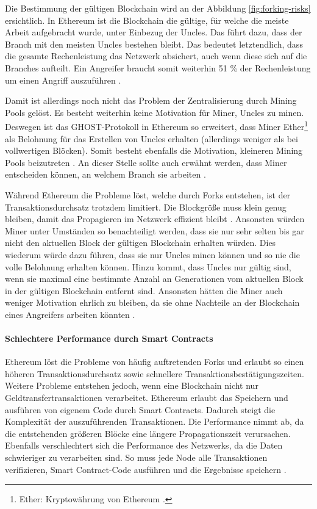 Die Bestimmung der gültigen Blockchain wird an der Abbildung \ref{fig:forking-risks} ersichtlich. In Ethereum ist die Blockchain die gültige, für welche die meiste Arbeit aufgebracht wurde, unter Einbezug der Uncles. Das führt dazu, dass der Branch mit den meisten Uncles bestehen bleibt. Das bedeutet letztendlich, dass die gesamte Rechenleistung das Netzwerk absichert, auch wenn diese sich auf die Branches aufteilt. Ein Angreifer braucht somit weiterhin 51 \% der Rechenleistung um einen Angriff auszuführen \cite{SompolinskyAcceleratingBitcoinTransaction2013}.

Damit ist allerdings noch nicht das Problem der Zentralisierung durch Mining Pools gelöst. Es besteht weiterhin keine Motivation für Miner, Uncles zu minen. Deswegen ist das GHOST-Protokoll in Ethereum so erweitert, dass Miner Ether\footnote{Ether: Kryptowährung von Ethereum \cite{EthereumTeamEthereumWhitePaper2017}.} als Belohnung für das Erstellen von Uncles erhalten (allerdings weniger als bei vollwertigen Blöcken). Somit besteht ebenfalls die Motivation, kleineren Mining Pools beizutreten \cite{EthereumTeamEthereumWhitePaper2017}. An dieser Stelle sollte auch erwähnt werden, dass Miner entscheiden können, an welchem Branch sie arbeiten \cite{ZhengBlockchainChallengesOpportunities2017}.

Während Ethereum die Probleme löst, welche durch Forks entstehen, ist der Transaktionsdurchsatz trotzdem limitiert. Die Blockgröße muss klein genug bleiben, damit das Propagieren im Netzwerk effizient bleibt \cite{SchererPerformanceScalabilityBlockchain2017}. Ansonsten würden Miner unter Umständen so benachteiligt werden, dass sie nur sehr selten bis gar nicht den aktuellen Block der gültigen Blockchain erhalten würden. Dies wiederum würde dazu führen, dass sie nur Uncles minen können und so nie die volle Belohnung erhalten können. Hinzu kommt, dass Uncles nur gültig sind, wenn sie maximal eine bestimmte Anzahl an Generationen vom aktuellen Block in der gültigen Blockchain entfernt sind. Ansonsten hätten die Miner auch weniger Motivation ehrlich zu bleiben, da sie ohne Nachteile an der Blockchain eines Angreifers arbeiten könnten \cite{EthereumTeamEthereumWhitePaper2017}.

\paragraph{Schlechtere Performance durch Smart Contracts}
Ethereum löst die Probleme von häufig auftretenden Forks und erlaubt so einen höheren Transaktionsdurchsatz sowie schnellere Transaktionsbestätigungszeiten. Weitere Probleme entstehen jedoch, wenn eine Blockchain nicht nur Geldtransfertransaktionen verarbeitet. Ethereum erlaubt das Speichern und ausführen von eigenem Code durch Smart Contracts. Dadurch steigt die Komplexität der auszuführenden Transaktionen. Die Performance nimmt ab, da die entstehenden größeren Blöcke eine längere Propagationszeit verursachen. Ebenfalls verschlechtert sich die Performance des Netzwerks, da die Daten schwieriger zu verarbeiten sind. So muss jede Node alle Transaktionen verifizieren, Smart Contract-Code ausführen und die Ergebnisse speichern \cite{SchererPerformanceScalabilityBlockchain2017}. 

